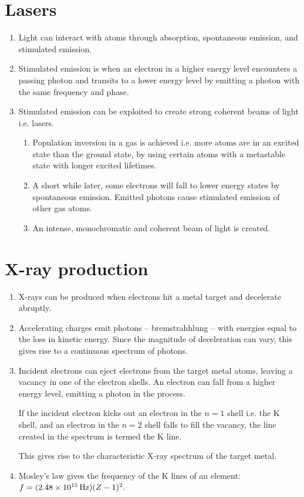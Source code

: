 \section{Lasers}
\begin{enumerate}
    \item Light can interact with atoms through absorption, spontaneous emission, and stimulated emission.
    \item Stimulated emission is when an electron in a higher energy level encounters a passing photon and transits to a lower energy level by emitting a photon with the same frequency and phase.
    \item Stimulated emission can be exploited to create strong coherent beams of light i.e. lasers.
    \begin{enumerate}
        \item Population inversion in a gas is achieved i.e. more atoms are in an excited state than the ground state, by using certain atoms with a metastable state with longer excited lifetimes.
        \item A short while later, some electrons will fall to lower energy states by spontaneous emission. Emitted photons cause stimulated emission of other gas atoms.
        \item An intense, monochromatic and coherent beam of light is created.
    \end{enumerate}
\end{enumerate}
\section{X-ray production}
\begin{enumerate}
    \item X-rays can be produced when electrons hit a metal target and decelerate abruptly. \item Accelerating charges emit photons -- bremstrahhlung -- with energies equal to the loss in kinetic energy. Since the magnitude of deceleration can vary, this gives rise to a continuous spectrum of photons.
    \item Incident electrons can eject electrons from the target metal atoms, leaving a vacancy in one of the electron shells. An electron can fall from a higher energy level, emitting a photon in the process.
    
    If the incident electron kicks out an electron in the \(n = 1\) shell i.e. the K shell, and an electron in the \(n=2\) shell falls to fill the vacancy, the line created in the spectrum is termed the K\textsubscript{\upalpha} line.
    
    This gives rise to the characteristic X-ray spectrum of the target metal.
    \item Mosley's law gives the frequency of the K\textsubscript{\upalpha} lines of an element: \(f = (\SI{2.48E15}{\hertz})(Z-1)^2\).
\end{enumerate}
